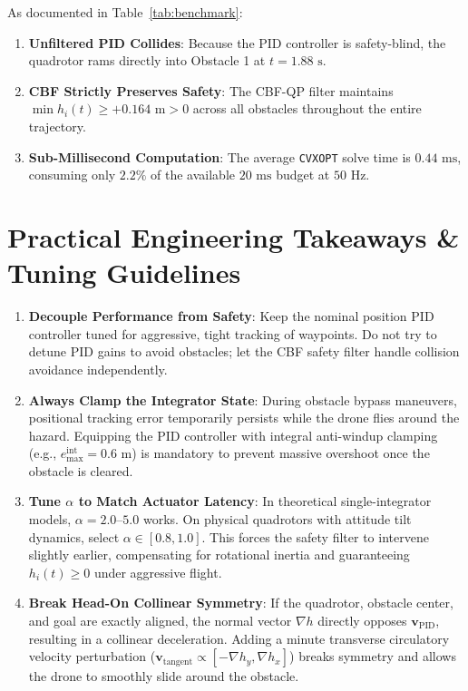 \documentclass[11pt,a4paper]{article}
\begin{document}
As documented in Table~\ref{tab:benchmark}:
\begin{enumerate}
    \item \textbf{Unfiltered PID Collides}: Because the PID controller is safety-blind, the quadrotor rams directly into Obstacle 1 at $t = 1.88\text{ s}$.
    \item \textbf{CBF Strictly Preserves Safety}: The CBF-QP filter maintains $\min h_i(t) \ge +0.164\text{ m} > 0$ across all obstacles throughout the entire trajectory.
    \item \textbf{Sub-Millisecond Computation}: The average \texttt{CVXOPT} solve time is $0.44\text{ ms}$, consuming only $2.2\%$ of the available $20\text{ ms}$ budget at $50\text{ Hz}$.
\end{enumerate}

\section{Practical Engineering Takeaways \& Tuning Guidelines}

\begin{enumerate}
    \item \textbf{Decouple Performance from Safety}:
    Keep the nominal position PID controller tuned for aggressive, tight tracking of waypoints. Do not try to detune PID gains to avoid obstacles; let the CBF safety filter handle collision avoidance independently.
    
    \item \textbf{Always Clamp the Integrator State}:
    During obstacle bypass maneuvers, positional tracking error temporarily persists while the drone flies around the hazard. Equipping the PID controller with integral anti-windup clamping (e.g., $e_{\max}^{\mathrm{int}} = 0.6\text{ m}$) is mandatory to prevent massive overshoot once the obstacle is cleared.
    
    \item \textbf{Tune $\alpha$ to Match Actuator Latency}:
    In theoretical single-integrator models, $\alpha = 2.0\text{--}5.0$ works. On physical quadrotors with attitude tilt dynamics, select $\alpha \in [0.8, 1.0]$. This forces the safety filter to intervene slightly earlier, compensating for rotational inertia and guaranteeing $h_i(t) \ge 0$ under aggressive flight.
    
    \item \textbf{Break Head-On Collinear Symmetry}:
    If the quadrotor, obstacle center, and goal are exactly aligned, the normal vector $\nabla h$ directly opposes $\mathbf{v}_{\mathrm{PID}}$, resulting in a collinear deceleration. Adding a minute transverse circulatory velocity perturbation ($\mathbf{v}_{\mathrm{tangent}} \propto [-\nabla h_y, \nabla h_x]$) breaks symmetry and allows the drone to smoothly slide around the obstacle.
\end{enumerate}
\end{document}

